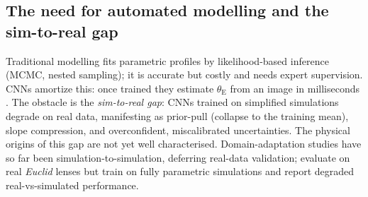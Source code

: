 \documentclass[fleqn,usenatbib]{mnras}
\newcommand{\thetaE}{\theta_{\mathrm{E}}}
\begin{document}
\subsection{The need for automated modelling and the sim-to-real gap}
Traditional modelling fits parametric profiles by likelihood-based inference
(MCMC, nested sampling); it is accurate but costly
\citep[${\sim}3$~min per lens;][]{Cao2025} and needs expert supervision. CNNs
amortize this: once trained they estimate $\thetaE$ from an image in
milliseconds \citep{Hezaveh2017,PerreaultLevasseur2017}. The obstacle is the
\emph{sim-to-real gap}: CNNs trained on simplified simulations degrade on real
data, manifesting as prior-pull (collapse to the training mean), slope
compression, and overconfident, miscalibrated uncertainties. The physical
origins of this gap are not yet well characterised. Domain-adaptation studies
\citep{Ciprijanovic2023,Agarwal2025,Swierc2024} have so far been
simulation-to-simulation, deferring real-data validation; \citet{Busillo2026}
evaluate on real \textit{Euclid} lenses but train on fully parametric
simulations and report degraded real-vs-simulated performance.
\end{document}
